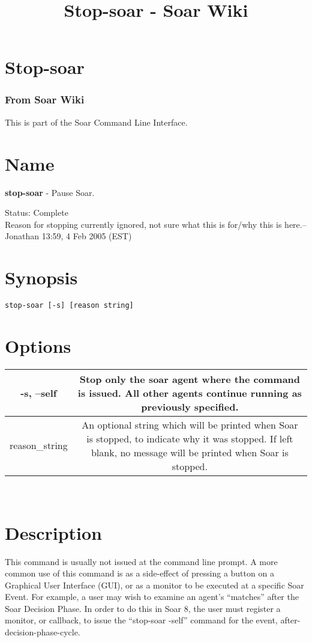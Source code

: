 \documentclass[10pt]{article}
\title{Stop-soar - Soar Wiki}
\begin{document}
\section*{Stop-soar}
\subsubsection*{From Soar Wiki}


 This is part of the Soar Command Line Interface. 
\section*{ Name }


 \textbf{stop-soar}
 - Pause Soar. 


 Status: Complete\\ 
Reason for stopping currently ignored, not sure what this is for/why this is here.--Jonathan 13:59, 4 Feb 2005 (EST) 
\section*{ Synopsis }
\begin{verbatim}
stop-soar [-s] [reason string]

\end{verbatim}
\section*{ Options }


\begin{tabular}{|c|c|}
\hline 
 -s, --self  & Stop only the soar agent where the command is issued. All other agents continue running as previously specified.  \\
 \hline 
 reason\_string  & An optional string which will be printed when Soar is stopped, to indicate why it was stopped. If left blank, no message will be printed when Soar is stopped.  \\
 \hline 

\end{tabular}



 \\ 

\section*{ Description }


 This command is usually not issued at the command line prompt. A more common use of this command is as a side-effect of pressing a button on a Graphical User Interface (GUI), or as a monitor to be executed at a specific Soar Event. For example, a user may wish to examine an agent's ``matches'' after the Soar Decision Phase. In order to do this in Soar 8, the user must register a monitor, or callback, to issue the ``stop-soar -self'' command for the event, after-decision-phase-cycle. 
\end{document}

